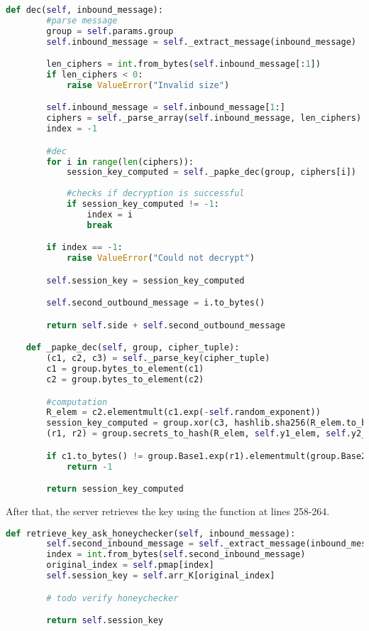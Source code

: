 \documentclass[../main.tex]{subfiles}
\begin{document}
\begin{lstlisting}[language=Python]
    def dec(self, inbound_message):
        #parse message
        group = self.params.group
        self.inbound_message = self._extract_message(inbound_message)

        len_ciphers = int.from_bytes(self.inbound_message[:1])
        if len_ciphers < 0:
            raise ValueError("Invalid size")

        self.inbound_message = self.inbound_message[1:]
        ciphers = self._parse_array(self.inbound_message, len_ciphers)
        index = -1

        #dec
        for i in range(len(ciphers)):
            session_key_computed = self._papke_dec(group, ciphers[i])
            
            #checks if decryption is successful
            if session_key_computed != -1:
                index = i
                break

        if index == -1:
            raise ValueError("Could not decrypt")

        self.session_key = session_key_computed

        self.second_outbound_message = i.to_bytes()

        return self.side + self.second_outbound_message

    def _papke_dec(self, group, cipher_tuple):
        (c1, c2, c3) = self._parse_key(cipher_tuple)
        c1 = group.bytes_to_element(c1)
        c2 = group.bytes_to_element(c2)

        #computation
        R_elem = c2.elementmult(c1.exp(-self.random_exponent))
        session_key_computed = group.xor(c3, hashlib.sha256(R_elem.to_bytes()).digest())
        (r1, r2) = group.secrets_to_hash(R_elem, self.y1_elem, self.y2_elem, session_key_computed)

        if c1.to_bytes() != group.Base1.exp(r1).elementmult(group.Base2.exp(r2)).to_bytes():
            return -1

        return session_key_computed
\end{lstlisting}

After that, the server retrieves the key using the function at lines 258-264.

\begin{lstlisting}[language=Python]
    def retrieve_key_ask_honeychecker(self, inbound_message):
        self.second_inbound_message = self._extract_message(inbound_message)
        index = int.from_bytes(self.second_inbound_message)
        original_index = self.pmap[index]
        self.session_key = self.arr_K[original_index]

        # todo verify honeychecker

        return self.session_key
\end{lstlisting}
\end{document}
